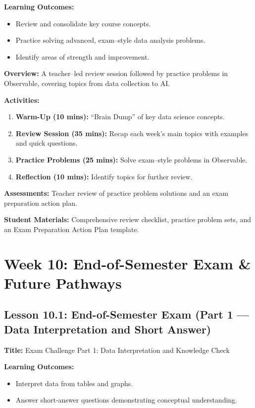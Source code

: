 \documentclass{tufte-book}
\begin{document}
\medskip
\textbf{Learning Outcomes:}
\begin{itemize}[leftmargin=*, label={\textbullet}]
    \item Review and consolidate key course concepts.
    \item Practice solving advanced, exam--style data analysis problems.
    \item Identify areas of strength and improvement.
\end{itemize}

\medskip
\textbf{Overview:}  
A teacher--led review session followed by practice problems in Observable, covering topics from data collection to AI.

\medskip
\textbf{Activities:}
\begin{enumerate}[label=\arabic*.]
    \item \textbf{Warm-Up (10 mins):} “Brain Dump” of key data science concepts.
    \item \textbf{Review Session (35 mins):} Recap each week’s main topics with examples and quick questions.
    \item \textbf{Practice Problems (25 mins):} Solve exam--style problems in Observable.
    \item \textbf{Reflection (10 mins):} Identify topics for further review.
\end{enumerate}

\medskip
\textbf{Assessments:}  
Teacher review of practice problem solutions and an exam preparation action plan.

\medskip
\textbf{Student Materials:}  
Comprehensive review checklist, practice problem sets, and an Exam Preparation Action Plan template.

\section{Week 10: End-of-Semester Exam \& Future Pathways}

\subsection{Lesson 10.1: End-of-Semester Exam (Part 1 --- Data Interpretation and Short Answer)}
\textbf{Title:} Exam Challenge Part 1: Data Interpretation and Knowledge Check

\medskip
\textbf{Learning Outcomes:}
\begin{itemize}[leftmargin=*, label={\textbullet}]
    \item Interpret data from tables and graphs.
    \item Answer short-answer questions demonstrating conceptual understanding.
\end{itemize}
\end{document}
